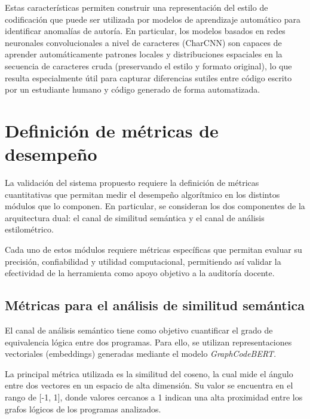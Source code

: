Estas características permiten construir una representación del estilo de codificación que puede ser utilizada por modelos de aprendizaje automático para identificar anomalías de autoría. En particular, los modelos basados en redes neuronales convolucionales a nivel de caracteres (CharCNN) son capaces de aprender automáticamente patrones locales y distribuciones espaciales en la secuencia de caracteres cruda (preservando el estilo y formato original), lo que resulta especialmente útil para capturar diferencias sutiles entre código escrito por un estudiante humano y código generado de forma automatizada.

\section{Definición de métricas de desempeño}

La validación del sistema propuesto requiere la definición de métricas cuantitativas que permitan medir el desempeño algorítmico en los distintos módulos que lo componen. En particular, se consideran los dos componentes de la arquitectura dual: el canal de similitud semántica y el canal de análisis estilométrico.

Cada uno de estos módulos requiere métricas específicas que permitan evaluar su precisión, confiabilidad y utilidad computacional, permitiendo así validar la efectividad de la herramienta como apoyo objetivo a la auditoría docente.

\subsection{Métricas para el análisis de similitud semántica}

El canal de análisis semántico tiene como objetivo cuantificar el grado de equivalencia lógica entre dos programas. Para ello, se utilizan representaciones vectoriales (embeddings) generadas mediante el modelo \textit{GraphCodeBERT}.

La principal métrica utilizada es la similitud del coseno, la cual mide el ángulo entre dos vectores en un espacio de alta dimensión. Su valor se encuentra en el rango de [-1, 1], donde valores cercanos a 1 indican una alta proximidad entre los grafos lógicos de los programas analizados.

